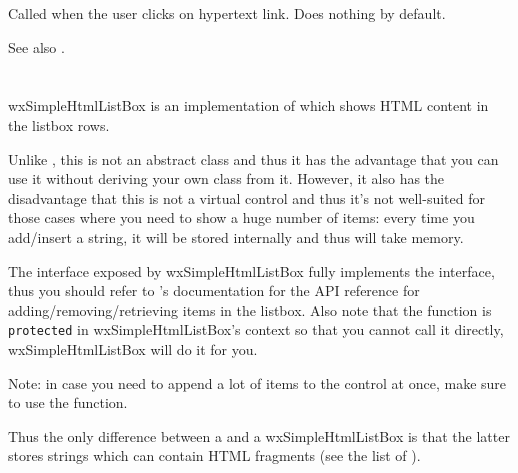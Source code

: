 
Called when the user clicks on hypertext link. Does nothing by default.





See also .







%
%


\section{}\label{wxsimplehtmllistbox}

wxSimpleHtmlListBox is an implementation of  which
shows HTML content in the listbox rows.

Unlike , this is not an abstract class and thus it
has the advantage that you can use it without deriving your own class from it.
However, it also has the disadvantage that this is not a virtual control and thus it's not
well-suited for those cases where you need to show a huge number of items: every time you
add/insert a string, it will be stored internally and thus will take memory.

The interface exposed by wxSimpleHtmlListBox fully implements the
 interface, thus you should refer to
's documentation for the API reference
for adding/removing/retrieving items in the listbox.
Also note that the  function is
{\tt protected} in wxSimpleHtmlListBox's context so that you cannot call it directly,
wxSimpleHtmlListBox will do it for you.

Note: in case you need to append a lot of items to the control at once, make sure to use the
 function.

Thus the only difference between a  and a wxSimpleHtmlListBox
is that the latter stores strings which can contain HTML fragments (see the list of
).

